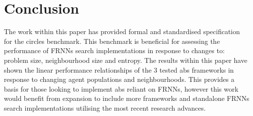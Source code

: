 \section{Conclusion\label{sec:conclusion}}
  The work within this paper has provided formal and standardised specification for the circles benchmark. This benchmark is beneficial for assessing the performance of FRNNs search implementations in response to changes to: problem size, neighbourhood size and entropy. The results within this paper have shown the linear performance relationships of the 3 tested \gls{abs} frameworks in response to changing agent populations and neighbourhoods. This provides a basis for those looking to implement \gls{abs} reliant on FRNNs, however this work would benefit from expansion to include more frameworks and standalone FRNNs search implementations utilising the most recent research advances.